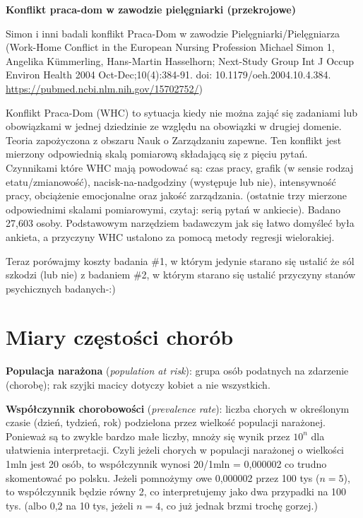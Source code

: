 \documentclass[
  openany]{book}
\begin{document}
\begin{example}
\textbf{Konflikt praca-dom w zawodzie pielęgniarki (przekrojowe)}

Simon i inni badali konflikt Praca-Dom w zawodzie Pielęgniarki/Pielęgniarza
(Work-Home Conflict in the European Nursing Profession
Michael Simon 1, Angelika Kümmerling, Hans-Martin Hasselhorn; Next-Study Group
Int J Occup Environ Health 2004 Oct-Dec;10(4):384-91. doi: 10.1179/oeh.2004.10.4.384.
\url{https://pubmed.ncbi.nlm.nih.gov/15702752/})

Konflikt Praca-Dom (WHC) to sytuacja kiedy
nie można zająć się zadaniami lub obowiązkami w jednej dziedzinie ze względu na obowiązki
w drugiej domenie. Teoria zapożyczona z obszaru Nauk o Zarządzaniu zapewne.
Ten konflikt jest mierzony odpowiednią skalą pomiarową składającą się z pięciu pytań.
Czynnikami które WHC mają powodować są: czas pracy,
grafik (w sensie rodzaj etatu/zmianowość),
nacisk-na-nadgodziny (występuje lub nie),
intensywność pracy,
obciążenie emocjonalne oraz jakość zarządzania.
(ostatnie trzy mierzone odpowiednimi skalami pomiarowymi,
czytaj: serią pytań w ankiecie).
Badano 27,603 osoby.
Podstawowym narzędziem badawczym jak się łatwo domyśleć była ankieta,
a przyczyny WHC ustalono za pomocą metody regresji wielorakiej.

Teraz porówajmy koszty badania \#1, w którym jedynie starano się ustalić że sól szkodzi (lub nie)
z badaniem \#2, w którym starano się ustalić przyczyny stanów psychicznych badanych-:)
\end{example}

\hypertarget{miary-czux119stoux15bci-choruxf3b}{%
\section{Miary częstości chorób}\label{miary-czux119stoux15bci-choruxf3b}}

\textbf{Populacja narażona} (\emph{population at risk}): grupa osób podatnych na zdarzenie (chorobę);
rak szyjki macicy dotyczy kobiet a nie wszystkich.

\textbf{Współczynnik chorobowości} (\emph{prevalence rate}): liczba chorych w określonym czasie (dzień, tydzień, rok) podzielona przez wielkość populacji narażonej.
Ponieważ są to zwykle bardzo małe liczby, mnoży się wynik przez \(10^n\) dla ułatwienia interpretacji.
Czyli jeżeli
chorych w populacji narażonej o wielkości 1mln jest 20 osób, to współczynnik wynosi 20/1mln = 0,000002 co trudno
skomentować po polsku. Jeżeli pomnożymy owe 0,000002 przez 100 tys (\(n=5\)), to współczynnik będzie równy 2,
co interpretujemy jako dwa przypadki na 100 tys.
(albo 0,2 na 10 tys, jeżeli \(n=4\), co już jednak brzmi trochę gorzej.)
\end{document}
